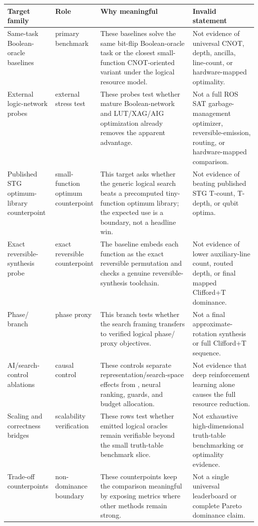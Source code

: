 \begin{tabularx}{\linewidth}{>{\raggedright\arraybackslash}p{0.18\linewidth}>{\raggedright\arraybackslash}p{0.15\linewidth}>{\raggedright\arraybackslash}X>{\raggedright\arraybackslash}p{0.26\linewidth}}
\toprule
Target family & Role & Why meaningful & Invalid statement \\
\midrule
Same-task Boolean-oracle baselines & primary benchmark & These baselines solve the same bit-flip Boolean-oracle task or the closest small-function CNOT-oriented variant under the logical resource model. & Not evidence of universal CNOT, depth, ancilla, line-count, or hardware-mapped optimality. \\
External logic-network probes & external stress test & These probes test whether mature Boolean-network and LUT/XAG/AIG optimization already removes the apparent advantage. & Not a full ROS SAT garbage-management optimizer, reversible-emission, routing, or hardware-mapped comparison. \\
Published STG optimum-library counterpoint & small-function optimum counterpoint & This target asks whether the generic logical search beats a precomputed tiny-function optimum library; the expected use is a boundary, not a headline win. & Not evidence of beating published STG T-count, T-depth, or qubit optima. \\
Exact reversible-synthesis probe & exact reversible counterpoint & The baseline embeds each function as the exact reversible permutation and checks a genuine reversible-synthesis toolchain. & Not evidence of lower auxiliary-line count, routed depth, or final mapped Clifford+T dominance. \\
Phase/\rz{} branch & phase proxy & This branch tests whether the search framing transfers to verified logical phase/\rz{} proxy objectives. & Not a final approximate-rotation synthesis or full Clifford+T sequence. \\
AI/search-control ablations & causal control & These controls separate representation/search-space effects from \mcts{}, neural ranking, guards, and budget allocation. & Not evidence that deep reinforcement learning alone causes the full resource reduction. \\
Scaling and correctness bridges & scalability verification & These rows test whether emitted logical oracles remain verifiable beyond the small truth-table benchmark slice. & Not exhaustive high-dimensional truth-table benchmarking or optimality evidence. \\
Trade-off counterpoints & non-dominance boundary & These counterpoints keep the comparison meaningful by exposing metrics where other methods remain strong. & Not a single universal leaderboard or complete Pareto dominance claim. \\
\bottomrule
\end{tabularx}
